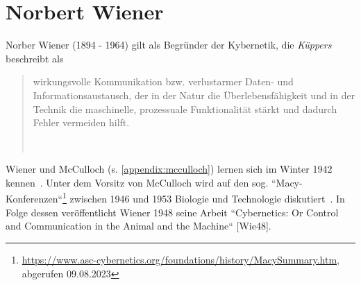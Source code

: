 \section{Norbert Wiener}\label{appendix:wiener}

Norber Wiener (1894 - 1964) gilt als Begründer der Kybernetik, die \textit{Küppers} beschreibt als

\blockquote[{~\cite[2]{Kup19}}]{
    wirkungsvolle Kommunikation bzw. verlustarmer Daten- und Informationsaustausch, der in der Natur die Überlebensfähigkeit und in der Technik die maschinelle, prozessuale Funktionalität stärkt und dadurch Fehler vermeiden hilft.
}

Wiener und McCulloch (s. \ref{appendix:mcculloch}) lernen sich im Winter 1942 kennen~\cite[218]{Mas90}.
Unter dem Vorsitz von McCulloch wird auf den sog. ``Macy-Konferenzen``\footnote{
    \url{https://www.asc-cybernetics.org/foundations/history/MacySummary.htm}, abgerufen 09.08.2023
} zwischen 1946 und 1953 Biologie und Technologie diskutiert~\cite[5]{Arb19}.
In Folge dessen veröffentlicht Wiener 1948 seine Arbeit ``Cybernetics: Or Control and Communication in the Animal and the Machine`` [Wie48].